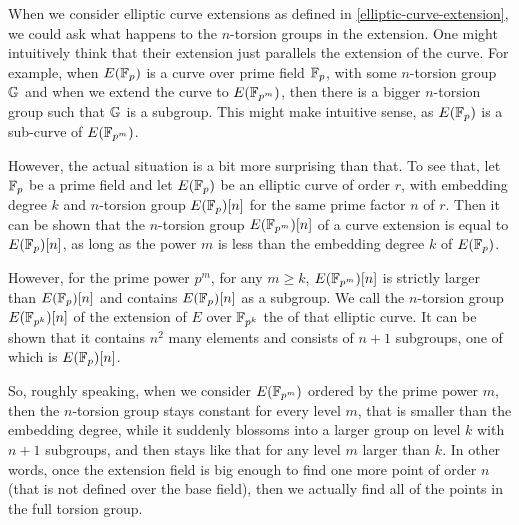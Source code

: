 When we consider elliptic curve extensions as defined in \ref{elliptic-curve-extension}, we could ask what happens to the $n$-torsion groups in the extension. One might intuitively think that their extension just parallels the extension of the curve. For example, when $E(\mathbb{F}_p)$ is a curve over prime field $\mathbb{F}_p$, with some $n$-torsion group $\mathbb{G}$ and when we extend the curve to $E(\mathbb{F}_{p^m})$, then there is a bigger $n$-torsion group such that $\mathbb{G}$ is a subgroup. This might make intuitive sense, as $E(\mathbb{F}_p)$ is a sub-curve of $E(\mathbb{F}_{p^m})$. 

However, the actual situation is a bit more surprising than that. To see that, let $\mathbb{F}_p$ be a prime field and let $E(\mathbb{F}_p)$ be an elliptic curve of order $r$, with embedding degree $k$ and $n$-torsion group $E(\mathbb{F}_p)[n]$ for the same prime factor $n$ of $r$. Then it can be shown that the $n$-torsion group $E(\mathbb{F}_{p^m})[n]$ of a curve extension is equal to $E(\mathbb{F}_p)[n]$, as long as the power $m$ is less than the embedding degree $k$ of $E(\mathbb{F}_p)$. 

However, for the prime power $p^m$, for any $m\geq k$, $E(\mathbb{F}_{p^m})[n]$ is strictly larger than $E(\mathbb{F}_p)[n]$ and contains $E(\mathbb{F}_p)[n]$ as a subgroup. We call the $n$-torsion group $E(\mathbb{F}_{p^k})[n]$ of the extension of $E$ over $\mathbb{F}_{p^k}$ the  of that elliptic curve. It can be shown that it contains $n^2$ many elements and consists of $n+1$ subgroups, one of which is $E(\mathbb{F}_{p})[n]$.

So, roughly speaking, when we consider  $E(\mathbb{F}_{p^m})$ ordered by the prime power $m$, then the $n$-torsion group stays constant for every level $m$, that is smaller than the embedding degree, while it suddenly blossoms into a larger group on level $k$ with $n+1$ subgroups, and then stays like that for any level $m$ larger than $k$. In other words, once the extension field is big enough to find one more point of order $n$ (that is not defined over the base field), then we actually find all of the points in the full torsion group.

